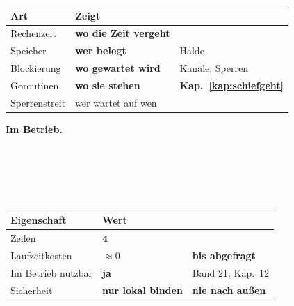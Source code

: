 \begin{merksatz}
\begin{center}
\renewcommand{\arraystretch}{1.5}
\begin{tabular}{@{}P{2.6cm}P{2.6cm}P{3.0cm}@{}}
\toprule
\textbf{Art} & \textbf{Zeigt} & \\
\midrule
Rechenzeit & \textbf{wo die Zeit vergeht} & \\
Speicher & \textbf{wer belegt} & \textcolor{gruen}{Halde}\\
Blockierung & \textbf{wo gewartet wird} & \textcolor{gruen}{Kanäle, Sperren}\\
Goroutinen & \textbf{wo sie stehen} & \textcolor{gruen}{\textbf{Kap.~\ref{kap:schiefgeht}}}\\
Sperrenstreit & wer wartet auf wen & \\
\bottomrule
\end{tabular}
\end{center}

\begin{center}
\begin{minipage}{0.88\textwidth}
\end{minipage}
\end{center}

\textbf{Im Betrieb.}

\begin{center}
\begin{minipage}{0.9\textwidth}
\\
\\
\\
\\
\code{\}()}
\end{minipage}
\end{center}

\begin{center}
\renewcommand{\arraystretch}{1.45}
\begin{tabular}{@{}P{3.0cm}P{2.2cm}P{2.8cm}@{}}
\toprule
\textbf{Eigenschaft} & \textbf{Wert} & \\
\midrule
Zeilen & \textcolor{gruen}{$\mathbf{4}$} & \\
Laufzeitkosten & \textcolor{gruen}{$\approx0$} & \textbf{bis abgefragt}\\
Im Betrieb nutzbar & \textcolor{gruen}{\textbf{ja}} & \textcolor{gruen}{Band 21, Kap.~12}\\
Sicherheit & \textcolor{akzent}{\textbf{nur lokal binden}} & \textcolor{akzent}{\textbf{nie nach außen}}\\
\bottomrule
\end{tabular}
\end{center}


\end{merksatz}
